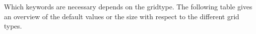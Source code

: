 \vspace{4mm}

Which keywords are necessary depends on the gridtype.
The following table gives an overview of the default values or the size
with respect to the different grid types.


